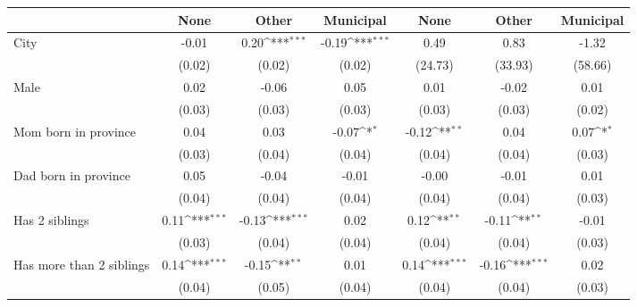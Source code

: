 {
\def\sym#1{\ifmmode^{#1}\else\(^{#1}\)\fi}
\begin{tabular}{l*{6}{c}}
\toprule
                    &\multicolumn{1}{c}{None}&\multicolumn{1}{c}{Other}&\multicolumn{1}{c}{Municipal}&\multicolumn{1}{c}{None}&\multicolumn{1}{c}{Other}&\multicolumn{1}{c}{Municipal}\\
\midrule
City                &       -0.01         &        0.20\sym{***}&       -0.19\sym{***}&        0.49         &        0.83         &       -1.32         \\
                    &      (0.02)         &      (0.02)         &      (0.02)         &     (24.73)         &     (33.93)         &     (58.66)         \\
\addlinespace
Male                &        0.02         &       -0.06         &        0.05         &        0.01         &       -0.02         &        0.01         \\
                    &      (0.03)         &      (0.03)         &      (0.03)         &      (0.03)         &      (0.03)         &      (0.02)         \\
\addlinespace
Mom born in province&        0.04         &        0.03         &       -0.07\sym{*}  &       -0.12\sym{**} &        0.04         &        0.07\sym{*}  \\
                    &      (0.03)         &      (0.04)         &      (0.04)         &      (0.04)         &      (0.04)         &      (0.03)         \\
\addlinespace
Dad born in province&        0.05         &       -0.04         &       -0.01         &       -0.00         &       -0.01         &        0.01         \\
                    &      (0.04)         &      (0.04)         &      (0.04)         &      (0.04)         &      (0.04)         &      (0.03)         \\
\addlinespace
Has 2 siblings      &        0.11\sym{***}&       -0.13\sym{***}&        0.02         &        0.12\sym{**} &       -0.11\sym{**} &       -0.01         \\
                    &      (0.03)         &      (0.04)         &      (0.04)         &      (0.04)         &      (0.04)         &      (0.03)         \\
\addlinespace
Has more than 2 siblings&        0.14\sym{***}&       -0.15\sym{**} &        0.01         &        0.14\sym{***}&       -0.16\sym{***}&        0.02         \\
                    &      (0.04)         &      (0.05)         &      (0.04)         &      (0.04)         &      (0.04)         &      (0.03)         \\

\end{tabular}}
